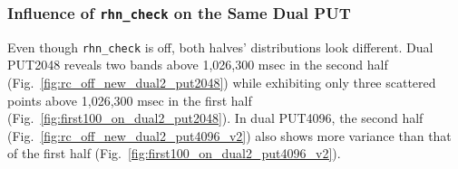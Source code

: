 \documentclass[10pt]{article}
\begin{document}
\clearpage
\newpage

\subsubsection{Influence of {\tt rhn\_check} on the Same Dual PUT}
Even though {\tt rhn\_check} is off, both halves' distributions look different. 
Dual PUT2048 reveals two bands above 1,026,300 msec in the second half (Fig.~\ref{fig:rc_off_new_dual2_put2048})
while exhibiting only three scattered points above 1,026,300 msec in the first half (Fig.~\ref{fig:first100_on_dual2_put2048}). 
In dual PUT4096, the second half (Fig.~\ref{fig:rc_off_new_dual2_put4096_v2}) also shows 
more variance than that of the first half (Fig.~\ref{fig:first100_on_dual2_put4096_v2}).

\begin{figure}[H]
	\centering
\end{figure}
\end{document}
